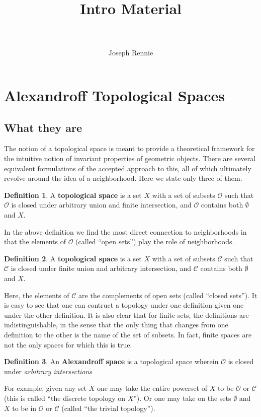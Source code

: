 \documentclass[paper=a4, fontsize=11pt]{scrartcl} %
\title{	
  \normalfont \normalsize 
  \horrule{0.5pt} \\[0.2cm] %
  Intro Material \\ %
  \horrule{2pt} \\[0.2cm] %
}
\author{Joseph Rennie} %
\numberwithin{equation}{section} %
\numberwithin{figure}{section} %
\numberwithin{table}{section} %
\theoremstyle{definition}
\newtheorem{definition}{Definition}[section]
\theoremstyle{remark}
\begin{document}

\section{Alexandroff Topological Spaces}
\subsection{What they are}
\indent
The notion of a topological space is meant to provide a theoretical framework for the intuitive notion of invariant properties of geometric objects.
There are several equivalent formulations of the accepted approach to this, all of which ultimately revolve around the idea of a neighborhood.
Here we state only three of them.
\begin{definition}
  A \textbf{topological space} is a set $X$ with a set of subsets $\mathcal{O}$ such that $\mathcal{O}$ is closed under arbitrary union and finite intersection, and $\mathcal{O}$ contains both $\emptyset$ and $X$.
\end{definition}

In the above definition we find the most direct connection to neighborhoods in that the elements of $\mathcal{O}$ (called ``open sets'') play the role of neighborhoods.

\begin{definition}
  A \textbf{topological space} is a set $X$ with a set of subsets $\mathcal{C}$ such that $\mathcal{C}$ is closed under finite union and arbitrary intersection, and $\mathcal{C}$ contains both $\emptyset$ and $X$.
\end{definition}

\indent
Here, the elements of $\mathcal{C}$ are the complements of open sets (called ``closed sets'').
It is easy to see that one can contruct a topology under one definition given one under the other definition.
It is also clear that for finite sets, the definitions are indistinguishable, in the sense that the only thing that changes from one definition to the other is the name of the set of subsets.
In fact, finite spaces are not the only spaces for which this is true. 

\begin{definition}
  An \textbf{Alexandroff space} is a topological space wherein $\mathcal{O}$ is closed under \textit{arbitrary intersections}
\end{definition}
For example, given any set $X$ one may take the entire powerset of $X$ to be $\mathcal{O}$ or $\mathcal{C}$ (this is called ``the discrete topology on $X$'').
Or one may take on the sets $\emptyset$ and $X$ to be in $\mathcal{O}$ or $\mathcal{C}$ (called ``the trivial topology'').
\end{document}
